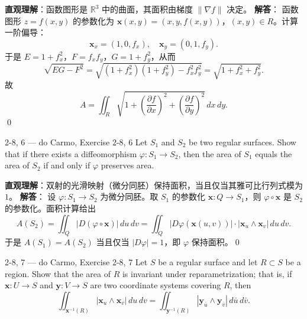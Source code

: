 \begin{solution}
\textbf{直观理解}：函数图形是 $\mathbb{R}^3$ 中的曲面，其面积由梯度 $\|\nabla f\|$ 决定。
\textbf{解答}：
函数图形 $z = f(x, y)$ 的参数化为 $\mathbf{x}(x, y) = (x, y, f(x, y))$，$(x, y) \in R$。计算一阶偏导：
\[
\mathbf{x}_x = (1, 0, f_x), \quad \mathbf{x}_y = (0, 1, f_y).
\]
于是 $E = 1 + f_x^2$，$F = f_x f_y$，$G = 1 + f_y^2$，从而
\[
\sqrt{EG - F^2} = \sqrt{(1+f_x^2)(1+f_y^2) - f_x^2 f_y^2} = \sqrt{1 + f_x^2 + f_y^2}.
\]
故
\[
A = \iint_R \sqrt{1 + \left(\frac{\partial f}{\partial x}\right)^2 + \left(\frac{\partial f}{\partial y}\right)^2} \, dx \, dy.
\]
\qed
\end{solution}
\begin{exercise}
{2-8, 6 — do Carmo, Exercise 2-8, 6}
Let $S_1$ and $S_2$ be two regular surfaces. Show that if there exists a diffeomorphism $\varphi: S_1 \to S_2$, then the area of $S_1$ equals the area of $S_2$ if and only if $\varphi$ preserves area.


\end{exercise}

\begin{solution}
\textbf{直观理解}：双射的光滑映射（微分同胚）保持面积，当且仅当其雅可比行列式模为 $1$。
\textbf{解答}：
设 $\varphi: S_1 \to S_2$ 为微分同胚。取 $S_1$ 的参数化 $\mathbf{x}: Q \to S_1$，则 $\varphi \circ \mathbf{x}$ 是 $S_2$ 的参数化。面积计算给出
\[
A(S_2) = \iint_Q |D(\varphi \circ \mathbf{x})| \, du \, dv = \iint_Q |D\varphi(\mathbf{x}(u,v))| \cdot |\mathbf{x}_u \wedge \mathbf{x}_v| \, du \, dv.
\]
于是 $A(S_1) = A(S_2)$ 当且仅当 $|D\varphi| = 1$，即 $\varphi$ 保持面积。\qed
\end{solution}
\begin{exercise}
{2-8, 7 — do Carmo, Exercise 2-8, 7}
Let $S$ be a regular surface and let $R \subset S$ be a region. Show that the area of $R$ is invariant under reparametrization; that is, if $\mathbf{x}: U \to S$ and $\mathbf{y}: V \to S$ are two coordinate systems covering $R$, then
\[
\iint_{\mathbf{x}^{-1}(R)} |\mathbf{x}_u \wedge \mathbf{x}_v| \, du \, dv = \iint_{\mathbf{y}^{-1}(R)} |\mathbf{y}_{\bar{u}} \wedge \mathbf{y}_{\bar{v}}| \, d\bar{u} \, d\bar{v}.
\]


\end{exercise}


